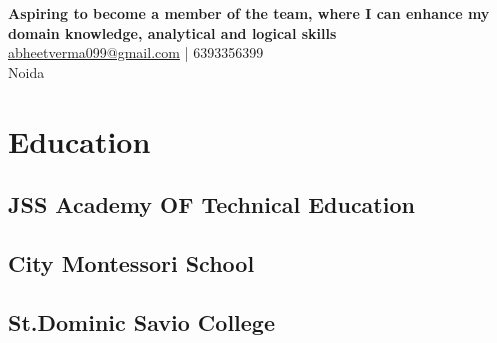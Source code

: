 \documentclass[]{resume}
\begin{document}
%
%
\lastupdated

%
%


{
\textbf{Aspiring to become a member of the team, where I can enhance my domain knowledge, analytical and logical skills}
 \\
\href{mailto:abheetverma099@gmail.com}{abheetverma099@gmail.com} | 6393356399\\Noida
}

%
%

\begin{minipage}[t]{0.33\textwidth} 


\section{Education} 

\subsection{JSS Academy OF Technical Education}
\sectionsep



\subsection{City Montessori School}
\sectionsep

\subsection{St.Dominic Savio College}
\sectionsep



\end{minipage}
\end{document}
